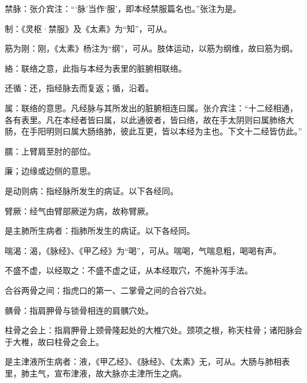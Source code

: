 \documentclass[12pt]{ctexbook}%
\begin{document}
\begin{jiaozhu}
  \item 禁脉：张介宾注：“‘脉’当作‘服’，即本经禁服篇名也。”张注为是。
  \item 制：《灵枢·禁服》及《太素》为“知”，可从。
  \item 筋为刚：刚，《太素》杨注为“纲”，可从。肢体运动，以筋为纲维，故曰筋为纲。
  \item 絡：联络之意，此指与本经为表里的脏腑相联络。
  \item 还循：还，指经脉去而复返；循，沿着。
  \item 属：联络的意思。凡经脉与其所发出的脏腑相连曰属。张介宾注：“十二经相通，各有表里。凡在本经者皆曰属，以此通彼者，皆曰络，故在手太阴则曰属肺络大肠，在手阳明则曰属大肠络肺，彼此互更，皆以本经为主也。下文十二经皆仿此。”
  \item 臑：上臂肩至肘的部位。
  \item 廉；边缘或边侧的意思。
  \item 是动则病：指经脉所发生的病证。以下各经同。
  \item 臂厥：经气由臂部厥逆为病，故称臂厥。
  \item 是主肺所生病者：指肺所发生的病证。以下各经同。
  \item 喘渴：渴，《脉经》、《甲乙经》为“喝”，可从。喘喝，气喘息粗，喝喝有声。
  \item 不盛不虚，以经取之：不盛不虚之证，从本经取穴，不施补泻手法。
  \item 合谷两骨之间：指虎口的第一、二掌骨之间的合谷穴处。
  \item 髃骨：指肩胛骨与锁骨相连的肩髃穴处。
  \item 柱骨之会上：指肩胛骨上颈骨隆起处的大椎穴处。颈项之根，称天柱骨；诸阳脉会于大椎，故曰柱骨之会上。
  \item 是主津液所生病者：液，《甲乙经》、《脉经》、《太素》无，可从。大肠与肺相表里，肺主气，宣布津液，故大脉亦主津所生之病。
\end{jiaozhu}

\end{document}
